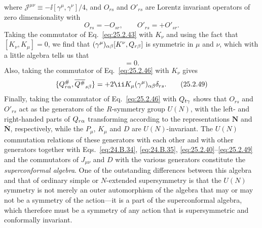 where \(\mathcal J^{\mu\nu}\equiv-\ii[\gamma^\mu,\gamma^\nu]/4\), and
\(O_{rs}\) and \(O'_{rs}\) are Lorentz invariant operators of zero
dimensionality with
\begin{equation}
O_{rs}=-O_{sr},
\qquad
O'_{rs}=+O'_{sr}.
\tag{25.2.47}\label{eq:25.2.47}
\end{equation}
Taking the commutator of Eq.~\eqref{eq:25.2.43} with \(K_\nu\) and using
the fact that \([K_\nu,K_\mu]=0\), we find that
\((\gamma^\mu)_{\alpha\beta}[K^\nu,Q_{r\beta}]\) is symmetric in
\(\mu\) and \(\nu\), which with a little algebra tells us that
\begin{equation}
[K^\nu,\MajoranaQ_{r\beta}]=0.
\tag{25.2.48}\label{eq:25.2.48}
\end{equation}
Also, taking the commutator of Eq.~\eqref{eq:25.2.46} with \(K_\nu\)
gives
\begin{equation}
\{\MajoranaQ^\#_{r\alpha},
\overline{\MajoranaQ^\#}_{s\beta}\}
=+2\ii K_\mu(\gamma^\mu)_{\alpha\beta}\delta_{rs}.
\tag{25.2.49}\label{eq:25.2.49}
\end{equation}
Finally, taking the commutator of Eq.~\eqref{eq:25.2.46} with
\(Q_{t\gamma}\) shows that \(O_{rs}\) and \(O'_{rs}\) act as the
generators of the \(R\)-symmetry group \(U(N)\), with the left- and
right-handed parts of \(Q_{r\alpha}\) transforming according to
the representations \(\mathbf N\) and \(\overline{\mathbf N}\),
respectively, while the \(P_\mu\), \(K_\mu\) and \(D\) are
\(U(N)\)-invariant. The \(U(N)\) commutation relations of these generators
with each other and with other generators together with
Eqs.~\eqref{eq:24.B.34}, \eqref{eq:24.B.35},
\eqref{eq:25.2.40}--\eqref{eq:25.2.49} and the commutators of
\(J_{\mu\nu}\) and \(D\) with the various generators constitute the
\emph{superconformal algebra}. One of the outstanding differences between
this algebra and that of ordinary simple or \(N\)-extended supersymmetry is
that the \(U(N)\) symmetry is not merely an outer automorphism of the
algebra that may or may not be a symmetry of the action---it is a part of
the superconformal algebra, which therefore must be a symmetry of any
action that is supersymmetric and conformally invariant.
